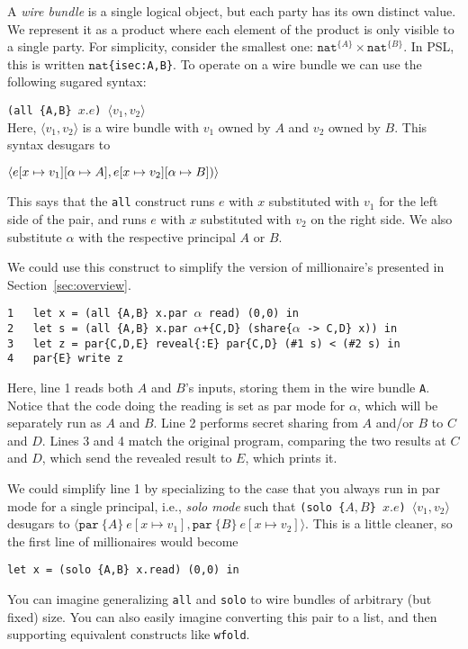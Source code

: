 \documentclass[10pt]{article}
\newcommand{\kw}[1]{\ensuremath{\mathtt{#1}}}
\newcommand{\tnat}{\ensuremath{\mathtt{nat}}}
\newcommand{\tpair}[2]{\ensuremath{{#1} \times {#2}}}
\newcommand{\epar}[2]{\ensuremath{\kw{par}~{#1}~{#2}}}
\newcommand{\epair}[2]{\ensuremath{\langle {#1}, {#2} \rangle}}
\begin{document}
A \emph{wire bundle} is a single logical object, but each party has
its own distinct value.  We represent it as a product where each
element of the product is only visible to a single party. For
simplicity, consider the smallest one:
$\tpair{\tnat^{\{A\}}}{\tnat^{\{B\}}}$. In PSL, this is written
$\tnat$\texttt{\{isec:A,B\}}. To operate on a wire bundle we can use the
following sugared syntax:

\bigskip
\noindent
\verb+(all {A,B} +$x.e$\verb+) +$\epair{v_1}{v_2}$\\

Here, $\epair{v_1}{v_2}$ is a wire bundle with $v_1$ owned by $A$ and $v_2$ owned by
$B$. This syntax desugars to

\bigskip
\noindent
$
\epair{e[x \mapsto v_1][\alpha \mapsto A]}{e[x \mapsto v_2][\alpha \mapsto B])}\\
$

This says that the \texttt{all} construct runs $e$ with $x$
substituted with $v_1$ for the left side of the pair, and runs $e$
with $x$ substituted with $v_2$ on the right side. We also substitute
$\alpha$ with the respective principal $A$ or $B$.

We could use this construct to simplify the version of millionaire's
presented in Section~\ref{sec:overview}.

\bigskip
\noindent
\verb+1   let x = (all {A,B} x.par +$\alpha$\verb+ read) (0,0) in+\\
\verb+2   let s = (all {A,B} x.par +$\alpha$\verb!+{C,D} (share{!$\alpha$\verb+ -> C,D} x)) in+\\
\verb+3   let z = par{C,D,E} reveal{:E} par{C,D} (#1 s) < (#2 s) in+\\
\verb+4   par{E} write z+

\bigskip
Here, line 1 reads both $A$ and $B$'s inputs, storing them in the wire
bundle \texttt{A}. Notice that the code doing the reading is set as
par mode for $\alpha$, which will be separately run as $A$ and
$B$. Line 2 performs secret sharing from $A$ and/or $B$ to $C$ and
$D$. Lines 3 and 4 match the original program, comparing the two
results at $C$ and $D$, which send the revealed result to $E$, which
prints it.

We could simplify line 1 by specializing to the case that you always
run in par mode for a single principal, i.e., \emph{solo mode} such
that 
\verb+(solo {+$A,B$\verb+} +$x.e$\verb+) +$\epair{v_1}{v_2}$
desugars to
$
\epair{\epar{\{A\}}{e}[x \mapsto v_1]}{\epar{\{B\}}{e[x \mapsto v_2]}}
$.
This is a little cleaner, so the first line of millionaires would become
\begin{verbatim}
let x = (solo {A,B} x.read) (0,0) in
\end{verbatim}
You can imagine generalizing \texttt{all} and \texttt{solo} to wire
bundles of arbitrary (but fixed) size. You can also easily imagine
converting this pair to a list, and then supporting equivalent
constructs like \texttt{wfold}.
\end{document}
